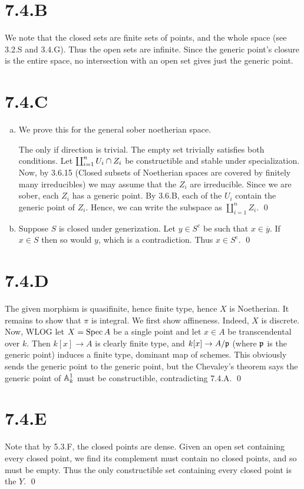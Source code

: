 \documentclass{article}
\begin{document}
\section{7.4.B}
We note that the closed sets are finite sets of points, and the whole space
(see 3.2.S and 3.4.G). Thus the open sets are infinite. Since the generic
point's closure is the entire space, no intersection with an open set gives
just the generic point.

\section{7.4.C}
\begin{enumerate}[a.]
    \item We prove this for the general sober noetherian space.

          The only if direction is trivial. The empty set trivially satisfies both
          conditions. Let $\coprod_{i=1}^n U_i \cap Z_i$ be constructible and stable under
          specialization. Now, by 3.6.15 (Closed subsets of Noetherian spaces are covered
          by finitely many irreducibles) we may assume that the $Z_i$
          are irreducible. Since we are sober, each $Z_i$ has a generic
          point. By 3.6.B, each of the $U_i$ contain the generic point
          of $Z_i$. Hence, we can write the subspace as
          $\coprod_{i=1}^n Z_i$. \qed
    \item Suppose $S$ is closed under generization. Let
          $y \in S^{\text{c}}$ be such that $x \in \overline{y}$. If
          $x \in S$ then so would $y$, which is a
          contradiction. Thus $x \in S^{\text{c}}$. \qed
\end{enumerate}

\section{7.4.D}
The given morphism is quasifinite, hence finite type, hence
$X$ is Noetherian. It remains to show that
$\pi$ is integral. We first show affineness. Indeed,
$X$ is discrete. Now, WLOG let $X=\operatorname{Spec} A$ be a
single point and let $x \in A$ be transcendental over
$k$. Then $k[x] \to A$ is clearly finite type,
and $k[x] \to A/\mathfrak{p}$ (where $\mathfrak{p}$ is the generic
point) induces a finite type, dominant map of schemes. This obviously sends the
generic point to the generic point, but the Chevaley's theorem says the generic
point of $\mathbb{A}_k^1$ must be constructible, contradicting 7.4.A.
\qed

\section{7.4.E}
Note that by 5.3.F, the closed points are dense. Given an open set containing
every closed point, we find its complement must contain no closed points, and
so must be empty. Thus the only constructible set containing every closed point
is the $Y$. \qed
\end{document}
